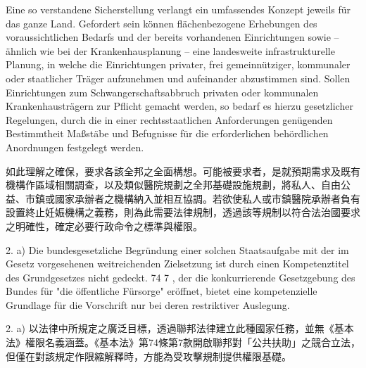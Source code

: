 \documentclass[12pt]{article}
\begin{document}
\begin{sourcepara}[title={原文E.238}]
Eine so verstandene Sicherstellung verlangt ein umfassendes Konzept jeweils für das ganze Land. Gefordert sein können flächenbezogene Erhebungen des voraussichtlichen Bedarfs und der bereits vorhandenen Einrichtungen sowie -- ähnlich wie bei der Krankenhausplanung -- eine landesweite infrastrukturelle Planung, in welche die Einrichtungen privater, frei gemeinnütziger, kommunaler oder staatlicher Träger aufzunehmen und aufeinander abzustimmen sind. Sollen Einrichtungen zum Schwangerschaftsabbruch privaten oder kommunalen Krankenhausträgern zur Pflicht gemacht werden, so bedarf es hierzu gesetzlicher Regelungen, durch die in einer rechtsstaatlichen Anforderungen genügenden Bestimmtheit Maßstäbe und Befugnisse für die erforderlichen behördlichen Anordnungen festgelegt werden.
\end{sourcepara}
\begin{transpara}
如此理解之確保，要求各該全邦之全面構想。可能被要求者，是就預期需求及既有機構作區域相關調查，以及類似醫院規劃之全邦基礎設施規劃，將私人、自由公益、市鎮或國家承辦者之機構納入並相互協調。若欲使私人或市鎮醫院承辦者負有設置終止妊娠機構之義務，則為此需要法律規制，透過該等規制以符合法治國要求之明確性，確定必要行政命令之標準與權限。
\end{transpara}

\begin{sourcepara}[title={原文E.239}]
2. a) Die bundesgesetzliche Begründung einer solchen Staatsaufgabe mit der im Gesetz vorgesehenen weitreichenden Zielsetzung ist durch einen Kompetenztitel des Grundgesetzes nicht gedeckt. \abbrArt{} 74 \abbrNr{} 7 \abbrGG{}\ggfnArtSeventyFourSevenDE{}, der die konkurrierende Gesetzgebung des Bundes für "die öffentliche Fürsorge" eröffnet, bietet eine kompetenzielle Grundlage für die Vorschrift nur bei deren restriktiver Auslegung.
\end{sourcepara}
\begin{transpara}
2. a) 以法律中所規定之廣泛目標，透過聯邦法律建立此種國家任務，並無《基本法》權限名義涵蓋。《基本法》第74條第7款\ggfnArtSeventyFourSevenZH{}開啟聯邦對「公共扶助」之競合立法，但僅在對該規定作限縮解釋時，方能為受攻擊規制提供權限基礎。
\end{transpara}
\end{document}
